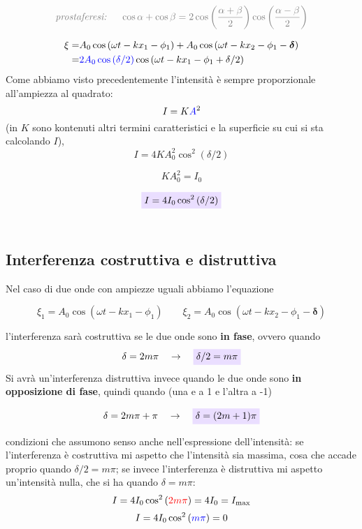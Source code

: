 \documentclass[x11names]{report}
\newcommand{\viola}[1]{\colorbox{yred}{$\displaystyle #1$}}
\begin{document}
		\[
		\textcolor{gray}{\textit{prostaferesi: } \quad \cos\alpha + \cos\beta = 2\cos\left(\frac{\alpha + \beta}{2}\right)\cos\left(\frac{\alpha - \beta}{2}\right)}
		\]
		
		\begin{align*}
			\xi =& A_0\cos\left(\omega t - kx_1 - \phi_1\right) + A_0\cos\left(\omega t - kx_2 - \phi_1 - \boldsymbol{\delta}\right)\\
				=& \textcolor{blue}{2A_0\cos\left(\delta/2\right)}\cos\left(\omega t - kx_1 - \phi_1+\delta/2\right)
		\end{align*}
		Come abbiamo visto precedentemente l'intensità è sempre proporzionale all'ampiezza al quadrato:
		\[ 
		I = K\textcolor{blue}{A}^2
		\]
		(in \(K\) sono kontenuti altri termini caratteristici e la superficie su cui si sta calcolando \(I\)),
		\[ 
		I = 4KA_0^2 \cos^2\left(\delta/2\right)
		\]
		
		\[ 
		\boxed{KA_0^2 = I_0}
		\]
		
		\begin{equation}
				\viola{I = 4I_0 \cos^2\left(\delta/2\right)}
		\end{equation} \\
		
		\begin{es}{}
			\subsection{Interferenza costruttiva e distruttiva}
			Nel caso di due onde con ampiezze uguali abbiamo l'equazione 
			
			\[ 
			\xi_1 = A_0\cos\left(\omega t - kx_1 - \phi_1\right)
			\qquad
			\xi_2 = A_0\cos\left(\omega t - kx_2 - \phi_1 - \boldsymbol{\delta}\right)
			\] 
			
			l'interferenza sarà costruttiva se le due onde sono \textbf{in fase}, ovvero quando 
			\[ 
			\delta = 2m\pi \quad \to \quad \viola{\delta/2 = m\pi }
			\]
			Si avrà un'interferenza distruttiva invece quando le due onde sono \textbf{in opposizione di fase}, quindi quando (una e a 1 e l'altra a -1)
			
			\[ 
			\delta = 2m\pi + \pi \quad \to \quad \viola{\delta = (2m+1)\pi }
			\]
			
			condizioni che assumono senso anche nell'espressione dell'intensità: se l'interferenza è costruttiva mi aspetto che l'intensità sia massima, cosa che accade proprio quando  \(\delta/2 = m\pi \); se invece l'interferenza è distruttiva mi aspetto un'intensità nulla, che si ha quando \(\delta = m\pi \):
			\[ 
			I = 4I_0 \cos^2\left(\textcolor{red}{2m\pi }\right) = 4I_0 = I_\text{max}
			\]
			\[ 
			I = 4I_0 \cos^2\left(\textcolor{blue}{m\pi }\right) = 0 
			\]
		\end{es}
		
\end{document}
